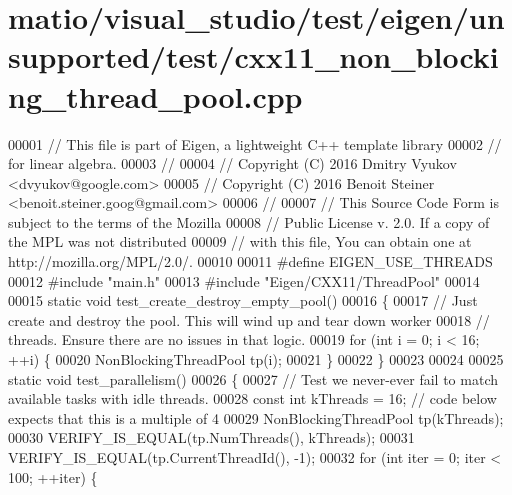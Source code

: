 \hypertarget{matio_2visual__studio_2test_2eigen_2unsupported_2test_2cxx11__non__blocking__thread__pool_8cpp_source}{}\section{matio/visual\+\_\+studio/test/eigen/unsupported/test/cxx11\+\_\+non\+\_\+blocking\+\_\+thread\+\_\+pool.cpp}
\label{matio_2visual__studio_2test_2eigen_2unsupported_2test_2cxx11__non__blocking__thread__pool_8cpp_source}

\begin{DoxyCode}
00001 \textcolor{comment}{// This file is part of Eigen, a lightweight C++ template library}
00002 \textcolor{comment}{// for linear algebra.}
00003 \textcolor{comment}{//}
00004 \textcolor{comment}{// Copyright (C) 2016 Dmitry Vyukov <dvyukov@google.com>}
00005 \textcolor{comment}{// Copyright (C) 2016 Benoit Steiner <benoit.steiner.goog@gmail.com>}
00006 \textcolor{comment}{//}
00007 \textcolor{comment}{// This Source Code Form is subject to the terms of the Mozilla}
00008 \textcolor{comment}{// Public License v. 2.0. If a copy of the MPL was not distributed}
00009 \textcolor{comment}{// with this file, You can obtain one at http://mozilla.org/MPL/2.0/.}
00010 
00011 \textcolor{preprocessor}{#define EIGEN\_USE\_THREADS}
00012 \textcolor{preprocessor}{#include "main.h"}
00013 \textcolor{preprocessor}{#include "Eigen/CXX11/ThreadPool"}
00014 
00015 \textcolor{keyword}{static} \textcolor{keywordtype}{void} test\_create\_destroy\_empty\_pool()
00016 \{
00017   \textcolor{comment}{// Just create and destroy the pool. This will wind up and tear down worker}
00018   \textcolor{comment}{// threads. Ensure there are no issues in that logic.}
00019   \textcolor{keywordflow}{for} (\textcolor{keywordtype}{int} i = 0; i < 16; ++i) \{
00020     NonBlockingThreadPool tp(i);
00021   \}
00022 \}
00023 
00024 
00025 \textcolor{keyword}{static} \textcolor{keywordtype}{void} test\_parallelism()
00026 \{
00027   \textcolor{comment}{// Test we never-ever fail to match available tasks with idle threads.}
00028   \textcolor{keyword}{const} \textcolor{keywordtype}{int} kThreads = 16;  \textcolor{comment}{// code below expects that this is a multiple of 4}
00029   NonBlockingThreadPool tp(kThreads);
00030   VERIFY\_IS\_EQUAL(tp.NumThreads(), kThreads);
00031   VERIFY\_IS\_EQUAL(tp.CurrentThreadId(), -1);
00032   \textcolor{keywordflow}{for} (\textcolor{keywordtype}{int} iter = 0; iter < 100; ++iter) \{

\end{DoxyCode}
